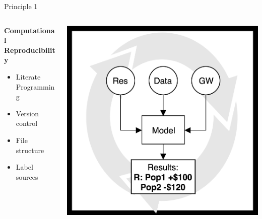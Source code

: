 \documentclass{beamer}
\begin{document}
\begin{frame}{Principle 1}
\begin{columns}
\begin{column}{0.3\textwidth}
\textbf{Computational Reproducibility}
\begin{itemize}
\item Literate \\ Programming
\item Version control
\item File structure
\item Label sources
\end{itemize}
\end{column}
\begin{column}{0.7\textwidth}  %
    \begin{center}
     \includegraphics[width=1\textwidth]{../Images/repro.png}
     \end{center}
\end{column}
\end{columns}
\end{frame}
\end{document}
